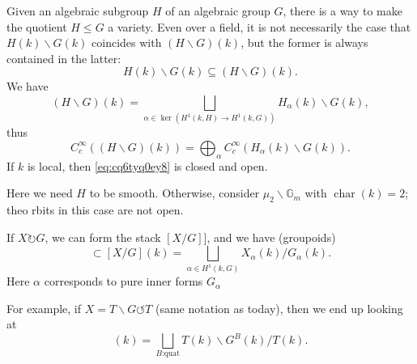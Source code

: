 \documentclass[reqno]{amsart} 
\numberwithin{theorem}{section}
\numberwithin{equation}{section}
\numberwithin{exercise}{section}
\begin{document}
\begin{remark}
  Given an algebraic subgroup $H$ of an algebraic group $G$, there is a way to make the quotient $H \leq G$ a variety.  Even over a field, it is not necessarily the case that $H(k) \backslash G(k)$ coincides with $(H \backslash G)(k)$, but the former is always contained in the latter:
  \begin{equation}\label{eq:cq6tyq0ey8}
    H(k) \backslash G(k) \subseteq (H \backslash G)(k).
  \end{equation}
  We have
  \begin{equation*}
    (H \backslash G)(k) = \bigsqcup_{\alpha \in \ker(H^1(k, H) \rightarrow H^1(k, G))}
    H_\alpha(k) \backslash G(k),
  \end{equation*}
  thus
  \begin{equation*}
    C_c^\infty((H \backslash G)(k)) = \bigoplus_{\alpha} C_c^\infty \left( H_\alpha(k) \backslash G(k) \right).
  \end{equation*}
  If $k$ is local, then \eqref{eq:cq6tyq0ey8} is closed and open.

  Here we need $H$ to be smooth.  Otherwise, consider $\mu_2 \backslash \mathbb{G}_m$ with $\operatorname{char}(k) = 2$; theo rbits in this case are not open.

  If $X \circlearrowright G$, we can form the stack $[X / G]]$, and we have (groupoids)
  \begin{equation*}
    [X(k) / G(k)] \subset [X/G](k) = \bigsqcup_{\alpha \in H^1(k, G)} X_\alpha(k) / G_\alpha(k).
  \end{equation*}
  Here $\alpha$ corresponds to pure inner forms $G_\alpha$

  For example, if $X = T \backslash G \circlearrowleft T$ (same notation as today), then we end up looking at
  \begin{equation*}
    [T \backslash G / T](k)
    = \bigsqcup_{B \text{:quat}}
    T(k) \backslash G^B(k) / T(k).
  \end{equation*}
\end{remark}


{} 
\end{document}
